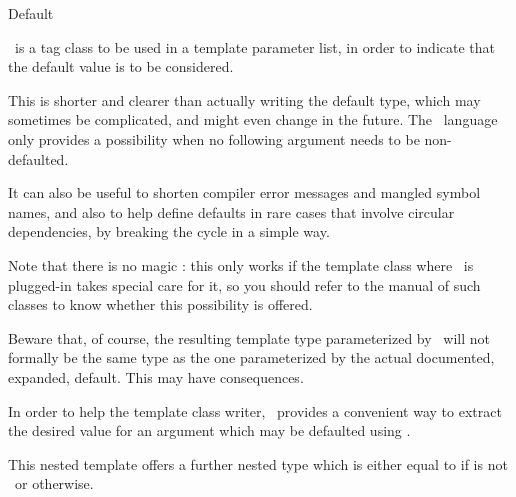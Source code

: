 \begin{ccRefClass}{Default}

\ccDefinition
\ccRefName\ is a tag class to be used in a template parameter list, in order to
indicate that the default value is to be considered.

This is shorter and clearer than actually writing the default type, which may
sometimes be complicated, and might even change in the future. The \CC\ language
only provides a possibility when no following argument needs to be non-defaulted.

It can also be useful to shorten compiler error messages and mangled symbol names,
and also to help define defaults in rare cases that involve circular
dependencies, by breaking the cycle in a simple way.

Note that there is no magic : this only works if the template class where
\ccRefName\ is plugged-in takes special care for it, so you should refer to the
manual of such classes to know whether this possibility is offered.

Beware that, of course, the resulting template type parameterized by \ccRefName\ will
not formally be the same type as the one parameterized by the actual documented,
expanded, default.  This may have consequences.

\ccIsModel
{}

\begin{ccAdvanced}

\ccTypes

In order to help the template class writer, \ccRefName\ provides a
convenient way to extract the desired value for an argument which may be
defaulted using \ccRefName.

{This nested template offers a further nested type  which is either
equal to  if  is not \ccRefName\, or
 otherwise.}

\end{ccAdvanced}



\end{ccRefClass} 
